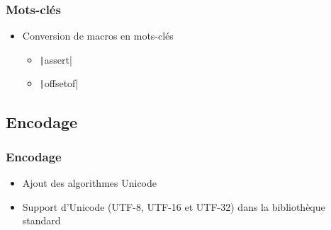 \documentclass[C++.tex]{subfiles}
\begin{document}
\begin{frame}[fragile]
	\frametitle{Mots-clés}
	\begin{itemize}
		\item Conversion de macros en mots-clés


		\begin{itemize}
			\item \texttt|assert|
			\item \texttt|offsetof|
		\end{itemize}
	\end{itemize}
\end{frame}

\subsection*{Encodage}
\begin{frame}[fragile]
	\frametitle{Encodage}
	\begin{itemize}
		\item Ajout des algorithmes Unicode


		\item Support d'Unicode (UTF-8, UTF-16 et UTF-32) dans la bibliothèque standard
	\end{itemize}
\end{frame}
\end{document}
